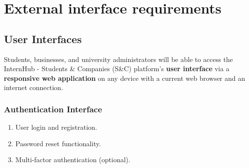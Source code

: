 \section{External interface requirements}
\label{sec:external_interface_requirements}%

\subsection{User Interfaces}
\label{subsec:User_interfaces}%

Students, businesses, and university administrators will be able to access the InternHub - Students \& Companies (S\&C) platform's \textbf{user interface} via a \textbf{responsive web application} on any device with a current web browser and an internet connection.
\subsubsection{Authentication Interface}
\begin{enumerate}
    \item User login and registration.
    \item Password reset functionality.
    \item Multi-factor authentication (optional).
\end{enumerate}

